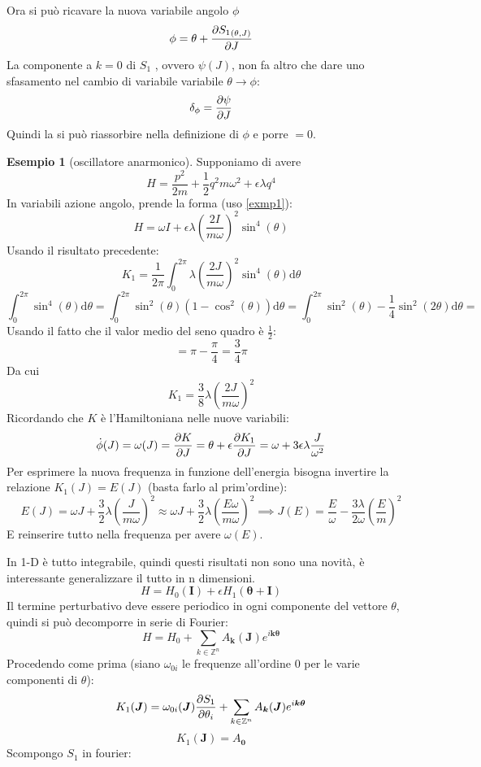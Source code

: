\documentclass[a4paper,12pt]{article}
\renewcommand{\arg}[1]{_{(#1)}}
\theoremstyle{plain}
\renewcommand{\vec}[1]{{\boldsymbol{#1}}}
\theoremstyle{definition}
\newtheorem{exmp}{Esempio}[section]
\newcommand{\f}[2]{\frac{#1}{#2}}
\renewcommand{\d}{\text{d}}
\newcommand{\ra}{\rightarrow}
\theoremstyle{remark}
\begin{document}
Ora si può ricavare la nuova variabile angolo $\phi$
\[\phi=\theta+\pdv{{S_1}\arg{\theta,J}}{J}\]
La componente a $k=0$ di $S_1$ , ovvero $\psi(J)$, non fa altro che dare uno sfasamento nel cambio di variabile variabile $\theta\ra\phi$:
\[\delta_\phi=\pdv{\psi}{J}		\]
Quindi la si  può riassorbire nella definizione di $\phi$ e porre $=0$.
\begin{exmp}[oscillatore anarmonico]
	Supponiamo di avere \[H=\f{p^2}{2m}+\f{1}{2}q^2 m\omega^2+\epsilon \lambda q^4		\]
	In variabili azione angolo, prende la forma (uso \ref{exmp1}):
	\[H=\omega I+ \epsilon\lambda	\left(\f{2I}{m\omega}\right)^2 \sin^4(\theta)	\]
	Usando il risultato precedente:
	\[K_1=\f{1}{2\pi}\int_0^{2\pi} 	\lambda	\left(\f{2J}{m\omega}\right)^2 \sin^4(\theta)\d \theta		\]
	\[\int_0^{2\pi }	\sin^4(\theta)\d \theta=\int_0^{2\pi }	\sin^2(\theta)(1-\cos^2(\theta))\d \theta=\int_0^{2\pi }	\sin^2(\theta)-\f{1}{4} \sin^2(2\theta)\d \theta=	\]
	Usando il fatto che il valor medio del seno quadro è $\f{1}{2}$:
	\[=\pi-\f{\pi}{4}=\f{3}{4}\pi		\]
	Da cui \[K_1=\f{3}{8}	\lambda	\left(\f{2J}{m\omega}\right)^2 \]
	Ricordando che $K$ è l'Hamiltoniana nelle nuove variabili:
	\[\dot{\phi}(J)=\omega(J)=\pdv{K}{J}=\theta+\epsilon\pdv{K_1}{J}=\omega+3\epsilon\lambda \f{J}{\omega^2}\]
	Per esprimere la nuova frequenza in funzione dell'energia bisogna invertire la relazione $K_1(J)=E(J)$ (basta farlo al prim'ordine):
	\[E(J)=\omega J+\f{3}{2}\lambda\left(\f{J}{m\omega}\right)^2\approx\omega J+\f{3}{2}\lambda\left(\f{E \omega}{m\omega}\right)^2	\implies J(E)= \f{E}{\omega}- \f{3\lambda}{2\omega}\left(\f{E}{m}\right)^2	\]
	E reinserire tutto nella frequenza per avere $\omega(E)$.




\end{exmp}
In 1-D è tutto integrabile, quindi questi risultati non sono una novità, è interessante generalizzare il tutto in n dimensioni.
\[H=H_0(\vec{I})+\epsilon H_1 (\vec{\theta}+\vec{I}) 		\]
Il termine perturbativo deve essere periodico in ogni componente del vettore $\theta$, quindi si può decomporre in serie di Fourier:
\[H=H_0+\sum_{k\in\mathbb{Z}^n}	A_{\vec{k}}	(\vec{J})	e^{i \vec{k}\vec{\theta}		}	\]
Procedendo come prima (siano $\omega_{0i}$ le frequenze all'ordine $0$ per le varie componenti di $\theta$):
\[K_1(\vec{J})=\omega_{0i}(\vec{J})\pdv{S_1}{\theta_i}+	\sum_{k\in\mathbb{Z}^n}	A_{\vec{k}}	(\vec{J})	e^{i \vec{k}\vec{\theta}	}		\]
\[K_1(\vec{J})=A_{\vec{0}}\]
Scompongo $S_1$ in fourier:
\end{document}
